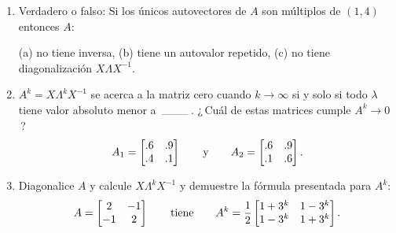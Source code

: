 \documentclass[12pt,a4paper]{article}
\newcommand\1{\mbox{\,\vrule height-0.8pt depth1.0pt width2pc\,}}
\newcommand\2{\mbox{\,\vrule height-0.8pt depth1.0pt width1pc\,}}
\newcommand\OG{\qquad\hbox{y}\qquad}
\def\hitem[#1]{\unskip\qquad\hbox to\standardindent{#1\hfil}\ignorespaces}
\begin{document}
\begin{enumerate}
\item Verdadero o falso: Si los únicos autovectores de $A$ son  múltiplos de $(1,4)$ entonces $A$:

\vspace{6pt}
\centerline{(a) no tiene inversa,\qquad
(b) tiene un autovalor repetido,\qquad
(c) no tiene diagonalización $X\Lambda X^{-1}$.}


\item $A^k=X\Lambda^k X^{-1}$ se acerca a la matriz cero cuando $k\to\infty$ si y solo si todo  $\lambda$ tiene valor absoluto menor a $\1$. ¿\,Cuál de estas matrices cumple $A^k\to0$\,?
\begin{displaymath}
  A_1=\begin{bmatrix} .6&.9\\ .4&.1\end{bmatrix}\OG
  A_2=\begin{bmatrix} .6&.9\\ .1&.6\end{bmatrix}.
\end{displaymath}


\item Diagonalice $A$ y calcule $X\Lambda^k X^{-1}$ y demuestre la fórmula presentada para $A^k$:
\begin{displaymath}
  A=\begin{bmatrix} 2 & -1\\
    -1 & 2\end{bmatrix}
    \qquad\hbox{tiene}\qquad
  A^k=\dfrac12\begin{bmatrix} 1+3^k & 1-3^k\\
    1-3^k & 1+3^k\end{bmatrix}.
\end{displaymath}


\end{enumerate}
\end{document}
